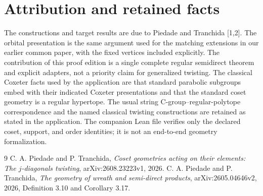 \section{Attribution and retained facts}
The constructions and target results are due to Piedade and Tranchida [1,2]. The orbital presentation is the same argument used for the matching extensions in our earlier common paper, with the fixed vertices included explicitly. The contribution of this proof edition is a single complete regular semidirect theorem and explicit adapters, not a priority claim for generalized twisting. The classical Coxeter facts used by the application are that standard parabolic subgroups embed with their indicated Coxeter presentations and that the standard coset geometry is a regular hypertope. The usual string C-group--regular-polytope correspondence and the named classical twisting constructions are retained as stated in the application. The companion Lean file verifies only the declared coset, support, and order identities; it is not an end-to-end geometry formalization.
\begin{thebibliography}{9}
 C. A. Piedade and P. Tranchida, \emph{Coset geometries acting on their elements: The $j$-diagonals twisting}, arXiv:2608.23223v1, 2026.
 C. A. Piedade and P. Tranchida, \emph{The geometry of wreath and semi-direct products}, arXiv:2605.04646v2, 2026, Definition 3.10 and Corollary 3.17.
\end{thebibliography}

